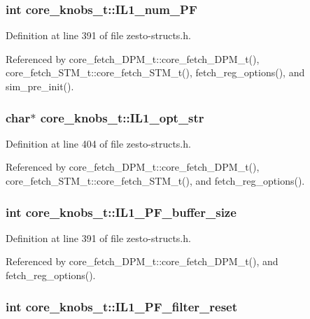 \subsubsection[{IL1\_\-num\_\-PF}]{\setlength{\rightskip}{0pt plus 5cm}int {\bf core\_\-knobs\_\-t::IL1\_\-num\_\-PF}}\label{structcore__knobs__t_44849b4e0751d9fabd27568f778bac14}




Definition at line 391 of file zesto-structs.h.

Referenced by core\_\-fetch\_\-DPM\_\-t::core\_\-fetch\_\-DPM\_\-t(), core\_\-fetch\_\-STM\_\-t::core\_\-fetch\_\-STM\_\-t(), fetch\_\-reg\_\-options(), and sim\_\-pre\_\-init().
\subsubsection[{IL1\_\-opt\_\-str}]{\setlength{\rightskip}{0pt plus 5cm}char$\ast$ {\bf core\_\-knobs\_\-t::IL1\_\-opt\_\-str}}\label{structcore__knobs__t_d72ddee06b53213f2481158fa3762d64}




Definition at line 404 of file zesto-structs.h.

Referenced by core\_\-fetch\_\-DPM\_\-t::core\_\-fetch\_\-DPM\_\-t(), core\_\-fetch\_\-STM\_\-t::core\_\-fetch\_\-STM\_\-t(), and fetch\_\-reg\_\-options().
\subsubsection[{IL1\_\-PF\_\-buffer\_\-size}]{\setlength{\rightskip}{0pt plus 5cm}int {\bf core\_\-knobs\_\-t::IL1\_\-PF\_\-buffer\_\-size}}\label{structcore__knobs__t_442425579eabbcc9157332ebacbb3974}




Definition at line 391 of file zesto-structs.h.

Referenced by core\_\-fetch\_\-DPM\_\-t::core\_\-fetch\_\-DPM\_\-t(), and fetch\_\-reg\_\-options().
\subsubsection[{IL1\_\-PF\_\-filter\_\-reset}]{\setlength{\rightskip}{0pt plus 5cm}int {\bf core\_\-knobs\_\-t::IL1\_\-PF\_\-filter\_\-reset}}\label{structcore__knobs__t_b0e94bfd4d8863c088e939f058cfd4d2}




